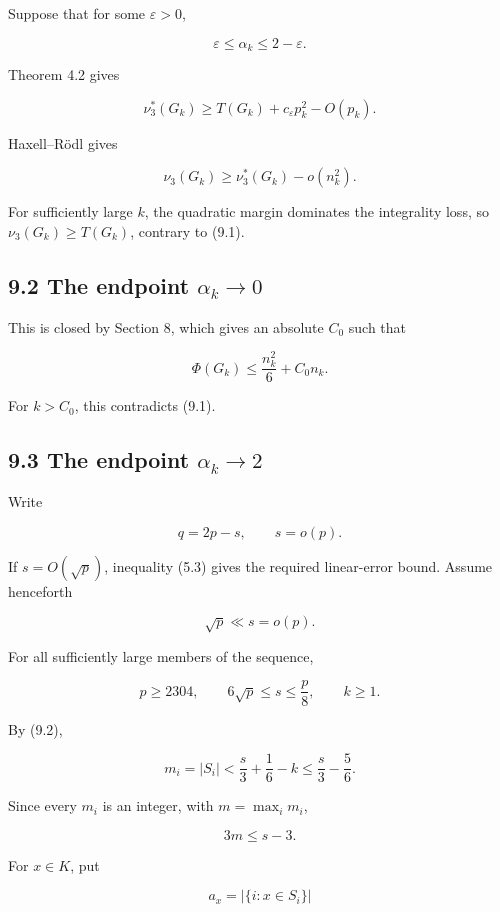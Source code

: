 \documentclass[
  11pt,
]{article}
\begin{document}
Suppose that for some \(\varepsilon>0\),

\[
\varepsilon\le\alpha_k\le2-\varepsilon.
\]

Theorem 4.2 gives

\[
\nu_3^*(G_k)
\ge
T(G_k)+c_\varepsilon p_k^2-O(p_k).
\]

Haxell--Rödl gives

\[
\nu_3(G_k)
\ge
\nu_3^*(G_k)-o(n_k^2).
\]

For sufficiently large \(k\), the quadratic margin dominates the
integrality loss, so \(\nu_3(G_k)\ge T(G_k)\), contrary to (9.1).

\subsection{\texorpdfstring{9.2 The endpoint
\(\alpha_k\to0\)}{9.2 The endpoint \textbackslash alpha\_k\textbackslash to0}}\label{the-endpoint-alpha_kto0}

This is closed by Section 8, which gives an absolute \(C_0\) such that

\[
\Phi(G_k)
\le
\frac{n_k^2}{6}+C_0n_k.
\]

For \(k>C_0\), this contradicts (9.1).

\subsection{\texorpdfstring{9.3 The endpoint
\(\alpha_k\to2\)}{9.3 The endpoint \textbackslash alpha\_k\textbackslash to2}}\label{the-endpoint-alpha_kto2}

Write

\[
q=2p-s,
\qquad
s=o(p).
\]

If \(s=O(\sqrt p)\), inequality (5.3) gives the required linear-error
bound. Assume henceforth

\[
\sqrt p\ll s=o(p).
\tag{9.3}
\]

For all sufficiently large members of the sequence,

\[
p\ge2304,
\qquad
6\sqrt p\le s\le\frac p8,
\qquad
k\ge1.
\tag{9.4}
\]

By (9.2),

\[
m_i=|S_i|
<
\frac s3+\frac16-k
\le
\frac s3-\frac56.
\]

Since every \(m_i\) is an integer, with \(m=\max_i m_i\),

\[
\boxed{3m\le s-3.}
\tag{9.5}
\]

For \(x\in K\), put

\[
a_x=|\{i:x\in S_i\}|
\]
\end{document}
